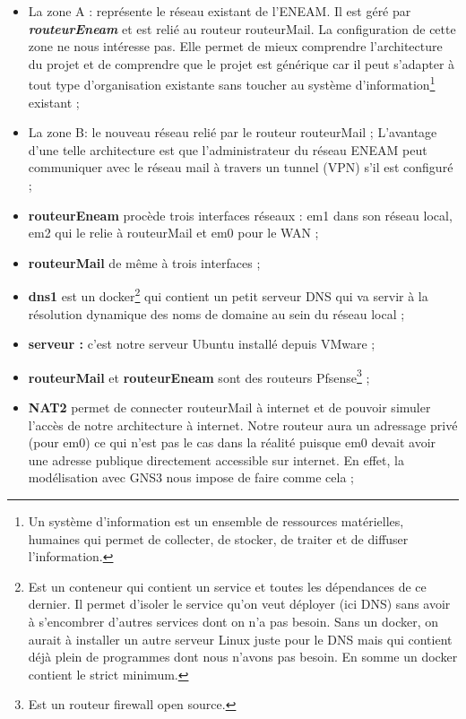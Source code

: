 \documentclass[a4paper,12pt,french]{report} %
\begin{document}
\begin{itemize}
\item La zone A : représente le réseau existant de l'ENEAM. Il est géré par \emph{\textbf{routeurEneam}} et est relié au routeur routeurMail. La configuration de cette zone ne nous intéresse pas. Elle permet de mieux comprendre l'architecture du projet et de comprendre que le projet est générique car il peut s'adapter à tout type d'organisation existante sans toucher au système d'information\footnote{Un système d'information est un ensemble de ressources matérielles, humaines qui permet de collecter, de stocker, de traiter et de diffuser l'information.} existant ;
\item La zone B: le nouveau réseau relié par le routeur routeurMail ;
L'avantage d'une telle architecture est que l'administrateur du réseau ENEAM peut communiquer avec le réseau mail à travers un tunnel (VPN) s'il est configuré ;
\item \textbf{routeurEneam} procède trois interfaces réseaux : em1 dans son réseau local, em2 qui le relie à routeurMail et em0 pour le WAN ;
\item \textbf{routeurMail} de même à trois interfaces ;
\item \textbf{dns1} est un docker\footnote{Est un conteneur qui contient un service et toutes les dépendances de ce dernier. Il permet d'isoler le service qu'on veut déployer (ici DNS) sans avoir à s'encombrer d'autres services dont on n'a pas besoin. Sans un docker, on aurait à installer un autre serveur Linux juste pour le DNS mais qui contient déjà plein de programmes dont nous n'avons  pas besoin. En somme un docker contient le strict minimum.} qui contient un petit serveur DNS qui va servir à la résolution dynamique des noms de domaine au sein du réseau local ;
\item \textbf{serveur :} c'est notre serveur Ubuntu installé depuis VMware ;
\item \textbf{routeurMail} et \textbf{routeurEneam} sont des routeurs Pfsense\footnote{Est un routeur firewall open source.} ;
\item \textbf{NAT2} permet de connecter routeurMail à internet et de pouvoir simuler l'accès de notre architecture à internet. Notre routeur aura un adressage privé (pour em0) ce qui n'est pas le cas dans la réalité puisque em0 devait avoir une adresse publique directement accessible sur internet. En effet, la modélisation avec GNS3 nous impose de faire comme cela ;
\end{itemize}
\end{document}
